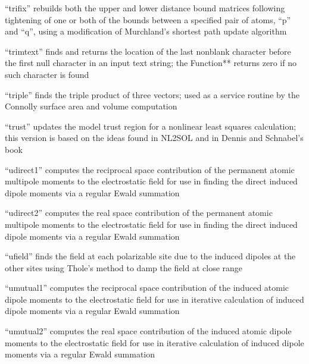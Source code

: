 \documentclass[letterpaper,11pt,english]{sphinxmanual}
\begin{document}
“trifix” rebuilds both the upper and lower distance bound matrices following tightening of one or both of the bounds between a specified pair of atoms, “p” and “q”, using a modification of Murchland’s shortest path update algorithm


“trimtext” finds and returns the location of the last non\sphinxhyphen{}blank character before the first null character in an input text string; the Function** returns zero if no such character is found


“triple” finds the triple product of three vectors; used as a service routine by the Connolly surface area and volume computation


“trust” updates the model trust region for a nonlinear least squares calculation; this version is based on the ideas found in NL2SOL and in Dennis and Schnabel’s book


“udirect1” computes the reciprocal space contribution of the permanent atomic multipole moments to the electrostatic field for use in finding the direct induced dipole moments via a regular Ewald summation


“udirect2” computes the real space contribution of the permanent atomic multipole moments to the electrostatic field for use in finding the direct induced dipole moments via a regular Ewald summation


“ufield” finds the field at each polarizable site due to the induced dipoles at the other sites using Thole’s method to damp the field at close range


“umutual1” computes the reciprocal space contribution of the induced atomic dipole moments to the electrostatic field for use in iterative calculation of induced dipole moments via a regular Ewald summation


“umutual2” computes the real space contribution of the induced atomic dipole moments to the electrostatic field for use in iterative calculation of induced dipole moments via a regular Ewald summation
\end{document}
